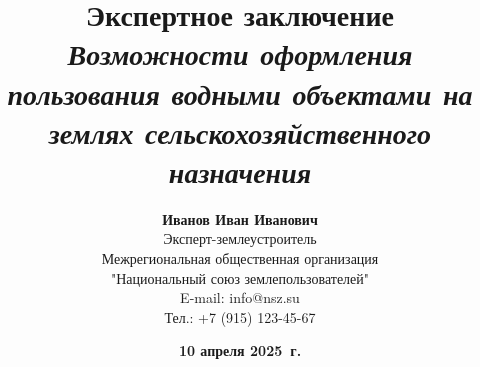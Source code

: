 \newcommand{\OrganizationName}{Межрегиональная общественная организация \\"Национальный союз землепользователей"}
\newcommand{\OrganizationAddress}{125009, г. Москва, пер. Старопименовский, д. 13, стр 4}
\newcommand{\OrganizationPhone}{+7 (915) 123-45-67}
\newcommand{\OrganizationEmail}{info@nsz.su}
\newcommand{\OrganizationWebsite}{https://nsz.su/}
\newcommand{\ReportTitle}{ЭКСПЕРТНЫЙ ОТЧЕТ}
\newcommand{\ReportSubject}{по исследованию землепользования\\[5pt] \textbf{Коломенского рыбхоза "Осенка"}}
\newcommand{\ExpertName}{Иванов Иван Иванович}
\newcommand{\ExpertPosition}{Эксперт землеустроитель и гидролог}
\newcommand{\ExpertContacts}{\texttt{+7 (916) 123-45-67}, \texttt{expert@yandex.ru}}
\newcommand{\ReportCity}{Москва}
\newcommand{\ReportYear}{\the\year}

\title{
    \LARGE\textbf{Экспертное заключение} \\
    \large\textit{Возможности оформления пользования водными объектами на землях сельскохозяйственного назначения}
}

\author{
    \small\textbf{\ExpertName} \\[4pt]
    \footnotesize Эксперт-землеустроитель \\
    \footnotesize \OrganizationName \\
    \footnotesize {E-mail: \OrganizationEmail} \\
    \footnotesize {Тел.: \OrganizationPhone}
}

\date{
    \small\textbf{10 апреля 2025~г.} \\[4pt]
}

\newcommand{\HeaderText}{Экспертное заключение}
